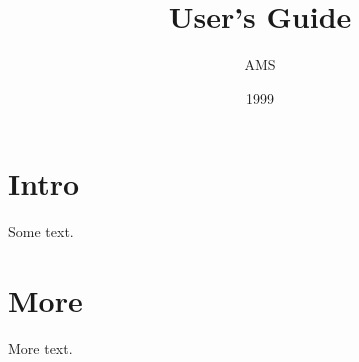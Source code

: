 \documentclass[leqno,titlepage,openany]{amsldoc}
\title{User's Guide}\author{AMS}\date{1999}
\begin{document}
\frontmatter
\maketitle
\tableofcontents
\mainmatter
\section{Intro}
Some text.
\section{More}
More text.
\end{document}
